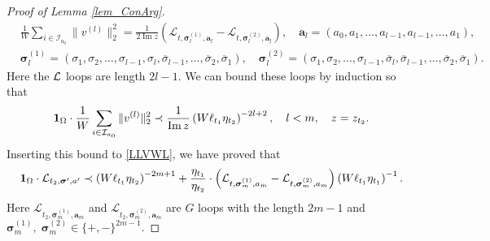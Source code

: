 \documentclass[10pt,reqno]{article}
\renewcommand{\bar}{\overline}
\theoremstyle{plain} %
\theoremstyle{remark}
\numberwithin{equation}{section}
\begin{document}
\begin{proof}[Proof of Lemma \ref{lem_ConArg}]
\begin{align} 
 &   \frac{1}{W} \sum_{i \in \mathcal{I}_{a_0}} \|v^{(l)}\|_2^2  = \frac{1}{2 \operatorname{Im} z} \left( \mathcal{L}_{t, \boldsymbol{\sigma}_l^{(1)}, \textbf{a}_l} - \mathcal{L}_{t, \boldsymbol{\sigma}_l^{(2)}, \textbf{a}_l} \right), \quad 
     \textbf{a}_l = (a_0, a_1, \ldots, a_{l-1}, a_{l-1}, \ldots, a_1), \nonumber \\
& \boldsymbol{\sigma}_l^{(1)}  = (\sigma_1, \sigma_2, \ldots, \sigma_{l-1}, \sigma_l, \bar{\sigma}_{l-1}, \ldots, \bar{\sigma}_2, \bar{\sigma}_1),\quad 
\boldsymbol{\sigma}_l^{(2)}  = (\sigma_1, \sigma_2, \ldots, \sigma_{l-1}, \bar{\sigma}_l, \bar{\sigma}_{l-1}, \ldots, \bar{\sigma}_2, \bar{\sigma}_1).    
\end{align} 
Here the  $\cal L$ loops are length $2l-1$. 
We can bound these loops by  induction so that 
$$
  {\bf 1}_{\Omega}\cdot   \frac{1}{W} \sum_{i \in \mathcal{I}_{a_0}} \|v^{(l)}\|_2^2 \prec \frac{1}{\operatorname{Im} z} \left( W \ell_{t_1} \eta_{t_2} \right)^{-2l+2}, \quad l < m,\quad z=z_{t_2}. 
$$
Inserting  this bound  to \eqref{LLVWL},   we have proved that
    \begin{equation}\label{LWLIMZ}
      {\bf 1}_{\Omega}\cdot    \mathcal{L}_{t_2, \boldsymbol{\sigma}', \textbf{a}'} \prec \left( W \ell_{t_1} \eta_{t_2} \right)^{-2m+1} + \frac{\eta_{t_1}}{\eta_{t_2}}
        \cdot
        \left(
        \mathcal{L}_{t, \boldsymbol{\sigma}_m^{(1)}, \textbf{a}_m} - \mathcal{L}_{t, \boldsymbol{\sigma}_m^{(2)}, \textbf{a}_m} \right) \left( W \ell_{t_1}\eta_{t_1} \right)^{-1}.
\end{equation}
Here $\mathcal{L}_{t_2, \boldsymbol{\sigma}_m^{(1)}, \textbf{a}_m}$ and $\mathcal{L}_{t_2, \boldsymbol{\sigma}_m^{(2)}, \textbf{a}_m}$ are   $G$ loops with the length $2m-1$ and   $\boldsymbol{\sigma}_m^{(1)}, \; \boldsymbol{\sigma}_m^{(2)}\in \{+,-\}^{2m-1}$.


\end{proof}
\end{document}
